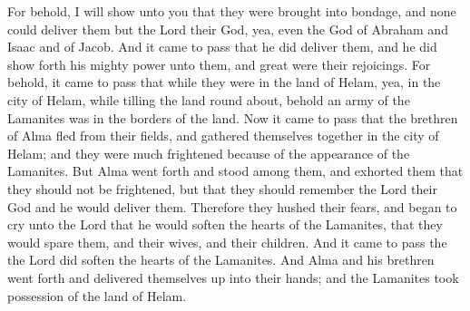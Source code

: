 \bverse \iffalse For behold, I will show unto you that they were brought into bondage, and none could deliver them but the Lord their God, yea, even the God of Abraham and Isaac and of Jacob. \fi
For behold, I will show unto you that they were brought into bondage, and none could deliver them but the Lord their God, yea, even the God of Abraham and Isaac and of Jacob.
\bverse \iffalse And it came to pass that he did deliver them, and he did show forth his mighty power unto them, and great were their rejoicings. \fi
And it came to pass that he did deliver them, and he did show forth his mighty power unto them, and great were their rejoicings.
\bverse \iffalse For behold, it came to pass that while they were in the land of Helam, yea, in the city of Helam, while tilling the land round about, behold an army of the Lamanites was in the borders of the land. \fi
For behold, it came to pass that while they were in the land of Helam, yea, in the city of Helam, while tilling the land round about, behold an army of the Lamanites was in the borders of the land.
\bverse \iffalse Now it came to pass that the brethren of Alma fled from their fields, and gathered themselves together in the city of Helam; and they were much frightened because of the appearance of the Lamanites. \fi
Now it came to pass that the brethren of Alma fled from their fields, and gathered themselves together in the city of Helam; and they were much frightened because of the appearance of the Lamanites.
\bverse \iffalse But Alma went forth and stood among them, and exhorted them that they should not be frightened, but that they should remember the Lord their God and he would deliver them. \fi
But Alma went forth and stood among them, and exhorted them that they should not be frightened, but that they should remember the Lord their God and he would deliver them.
\bverse \iffalse Therefore they hushed their fears, and began to cry unto the Lord that he would soften the hearts of the Lamanites, that they would spare them, and their wives, and their children. \fi
Therefore they hushed their fears, and began to cry unto the Lord that he would soften the hearts of the Lamanites, that they would spare them, and their wives, and their children.
\bverse \iffalse And it came to pass the the Lord did soften the hearts of the Lamanites. And Alma and his brethren went forth and delivered themselves up into their hands; and the Lamanites took possession of the land of Helam. \fi
And it came to pass the the Lord did soften the hearts of the Lamanites. And Alma and his brethren went forth and delivered themselves up into their hands; and the Lamanites took possession of the land of Helam.
